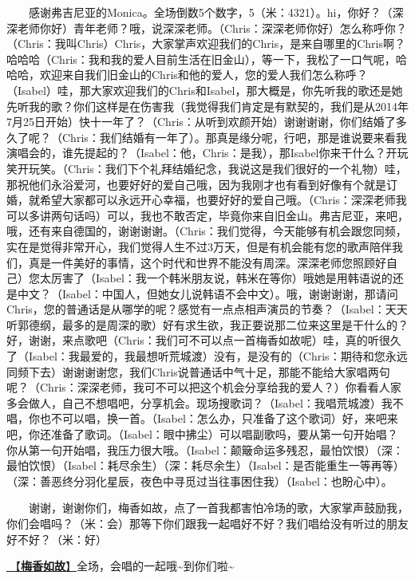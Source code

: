 \documentclass[]{ctexbook}
\begin{document}
  感谢弗吉尼亚的Monica。全场倒数5个数字，5（米：4321）。hi，你好？（深深老师你好）青年老师？哦，说深深老师。（Chris：深深老师你好）怎么称呼你？（Chris：我叫Chris）Chris，大家掌声欢迎我们的Chris，是来自哪里的Chris啊？哈哈哈（Chris：我和我的爱人目前生活在旧金山），等一下，我松了一口气呢，哈哈哈，欢迎来自我们旧金山的Chris和他的爱人，您的爱人我们怎么称呼？（Isabel）哇，那大家欢迎我们的Chris和Isabel，那大概是，你先听我的歌还是她先听我的歌？你们这样是在伤害我（我觉得我们肯定是有默契的，我们是从2014年7月25日开始）快十一年了？（Chris：从听到欢颜开始）谢谢谢谢，你们结婚了多久了呢？（Chris：我们结婚有一年了）。那真是缘分呢，行吧，那是谁说要来看我演唱会的，谁先提起的？（Isabel：他，Chris：是我），那Isabel你来干什么？开玩笑开玩笑。（Chris：我们下个礼拜结婚纪念，我说这是我们很好的一个礼物）哇，那祝他们永浴爱河，也要好好的爱自己哦，因为我刚才也有看到好像有个就是订婚，就希望大家都可以永远开心幸福，也要好好的爱自己哦。（Chris：深深老师我可以多讲两句话吗）可以，我也不敢否定，毕竟你来自旧金山。弗吉尼亚，来吧，哦，还有来自德国的，谢谢谢谢。（Chris：我们觉得，今天能够有机会跟您同频，实在是觉得非常开心，我们觉得人生不过3万天，但是有机会能有您的歌声陪伴我们，真是一件美好的事情，这个时代和世界不能没有周深。深深老师您照顾好自己）您太厉害了（Isabel：我一个韩米朋友说，韩米在等你）哦她是用韩语说的还是中文？（Isabel：中国人，但她女儿说韩语不会中文）。哦，谢谢谢谢，那请问Chris，您的普通话是从哪学的呢？感觉有一点点相声演员的节奏？（Isabel：天天听郭德纲，最多的是周深的歌）好有求生欲，我正要说那二位来这里是干什么的？好，谢谢，来点歌吧（Chris：我们可不可以点一首梅香如故呢）哇，真的听很久了（Isabel：我最爱的，我最想听荒城渡）没有，是没有的（Chris：期待和您永远同频下去）谢谢谢谢您，我们Chris说普通话中气十足，那能不能给大家唱两句呢？（Chris：深深老师，我可不可以把这个机会分享给我的爱人？）你看看人家多会做人，自己不想唱吧，分享机会。现场搜歌词？（Isabel：我唱荒城渡）我不唱，你也不可以唱，换一首。（Isabel：怎么办，只准备了这个歌词）好，来吧来吧，你还准备了歌词。（Isabel：眼中拂尘）可以唱副歌吗，要从第一句开始唱？你从第一句开始唱，我压力很大哦。（Isabel：颠簸命运多残忍，最怕饮恨）（深：最怕饮恨）（Isabel：耗尽余生）（深：耗尽余生）（Isabel：是否能重生一等再等）（深：善恶终分羽化星辰，夜色中寻觅过当往事困住我）（Isabel：也盼心中）。

  谢谢，谢谢你们，梅香如故，点了一首我都害怕冷场的歌，大家掌声鼓励我，你们会唱吗？（米：会）那等下你们跟我一起唱好不好？我们唱给没有听过的朋友好不好？（米：好）

\hyperref[mei-xiang-ru-gu]{🎵【\textbf{梅香如故}】}全场，会唱的一起哦\textasciitilde 到你们啦\textasciitilde{}
\end{document}
